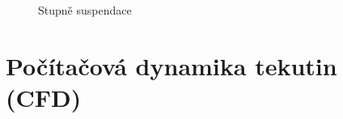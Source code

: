 \begin{figure}[h!]
  \qquad
  \caption{Stupně suspendace}
  \label{fig:typsus}
\end{figure}




\section{Počítačová dynamika tekutin (CFD)}



